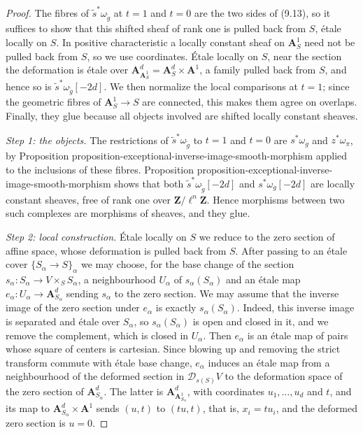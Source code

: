 \documentclass[11pt]{article}
\begin{document}
\begin{proof}[{Proof}]\label{bp30}%
The fibres of \(\widetilde s^{*}\omega_{\widetilde g}\) at \(t=1\) and \(t=0\) are the two sides of (9.13), so it suffices to show that this shifted sheaf of rank one is pulled back from \(S\), étale locally on \(S\). In positive characteristic a locally constant sheaf on \(\mathbf A^1_S\) need not be pulled back from \(S\), so we use coordinates. Étale locally on \(S\), near the section the deformation is étale over \(\mathbf A^d_{\mathbf A^1_S}=\mathbf A^d_S\times\mathbf A^1\), a family pulled back from \(S\), and hence so is \(\widetilde s^{*}\omega_{\widetilde g}[-2d]\). We then normalize the local comparisons at \(t=1\); since the geometric fibres of \(\mathbf A^1_S\to S\) are connected, this makes them agree on overlaps. Finally, they glue because all objects involved are shifted locally constant sheaves.

\emph{Step 1: the objects.} The restrictions of \(\widetilde s^{*}\omega_{\widetilde g}\) to \(t=1\) and \(t=0\) are \(s^{*}\omega_{g}\) and \(z^{*}\omega_{\pi}\), by Proposition proposition-exceptional-inverse-image-smooth-morphism applied to the inclusions of these fibres. Proposition proposition-exceptional-inverse-image-smooth-morphism shows that both \(\widetilde s^{*}\omega_{\widetilde g}[-2d]\) and \(s^{*}\omega_{g}[-2d]\) are locally constant sheaves, free of rank one over \(\mathbf Z/\ell^n\mathbf Z\). Hence morphisms between two such complexes are morphisms of sheaves, and they glue.

\emph{Step 2: local construction.} Étale locally on \(S\) we reduce to the zero section of affine space, whose deformation is pulled back from \(S\). After passing to an étale cover \(\{S_\alpha\to S\}_\alpha\) we may choose, for the base change of the section \(s_\alpha:S_\alpha\to V\times_SS_\alpha\), a neighbourhood \(U_\alpha\) of \(s_\alpha(S_\alpha)\) and an étale map \(e_\alpha:U_\alpha\to\mathbf A^d_{S_\alpha}\) sending \(s_\alpha\) to the zero section. We may assume that the inverse image of the zero section under \(e_\alpha\) is exactly \(s_\alpha(S_\alpha)\). Indeed, this inverse image is separated and étale over \(S_\alpha\), so \(s_\alpha(S_\alpha)\) is open and closed in it, and we remove the complement, which is closed in \(U_\alpha\). Then \(e_\alpha\) is an étale map of pairs whose square of centers is cartesian. Since blowing up and removing the strict transform commute with étale base change, \(e_\alpha\) induces an étale map from a neighbourhood of the deformed section in \(\mathcal D_{s(S)}V\) to the deformation space of the zero section of \(\mathbf A^d_{S_\alpha}\). The latter is \(\mathbf A^d_{\mathbf A^1_{S_\alpha}}\), with coordinates \(u_1,\ldots,u_d\) and \(t\), and its map to \(\mathbf A^d_{S_\alpha}\times\mathbf A^1\) sends \((u,t)\) to \((tu,t)\), that is, \(x_i=tu_i\), and the deformed zero section is \(u=0\).


\end{proof}
\end{document}
